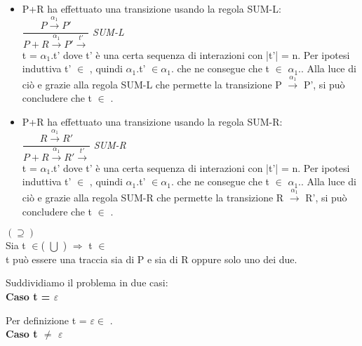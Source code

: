 \begin{itemize}
	\item P+R ha effettuato una transizione usando la regola SUM-L:\\
	
	 	$\dfrac{P \overset{\alpha_{1}}\rightarrow P'}{P + R \overset{\alpha_{1}}\rightarrow P'\overset{t'}\rightarrow}$ \textit{SUM-L} \\
	 	
	 	t = $\alpha_{1}.$t' dove t' è una certa sequenza di interazioni con |t'| = n. Per ipotesi induttiva t' $\in$ , quindi 
	 	$\alpha_{1}.$t' $\in \alpha_{1}.$ che ne consegue che t $\in$ $\alpha_{1}.$. Alla luce di ciò e grazie alla regola SUM-L che permette la transizione P $\overset{\alpha_{1}}\rightarrow $ P', si può concludere che  t $\in$  .
	 	\\
	 	
	 \item P+R ha effettuato una transizione usando la regola SUM-R:\\
	 
	 $\dfrac{R \overset{\alpha_{1}}\rightarrow R'}{P + R \overset{\alpha_{1}}\rightarrow R'\overset{t'}\rightarrow}$ \textit{SUM-R} \\
	 
		t = $\alpha_{1}.$t' dove t' è una certa sequenza di interazioni con |t'| = n. Per ipotesi induttiva t' $\in$ , quindi 
	$\alpha_{1}.$t' $\in \alpha_{1}.$ che ne consegue che t $\in$ $\alpha_{1}.$. Alla luce di ciò e grazie alla regola SUM-R che permette la transizione R $\overset{\alpha_{1}}\rightarrow $ R', si può concludere che  t $\in$  .
	\\
	 	
\end{itemize}

$(\supseteq)$\\

Sia t $\in$( $\bigcup$ ) $\Rightarrow $  t $\in$\\
t può essere una traccia sia di P e sia di R oppure solo uno dei due.

Suddividiamo il problema in due casi:
\\

\textbf{Caso t = $\varepsilon$}

Per definizione t = $\varepsilon \in $ .
\\

\textbf{Caso t $\not=$ $\varepsilon$}

